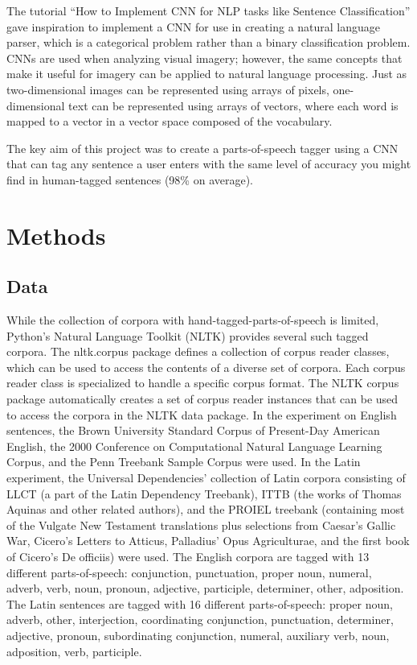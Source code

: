\documentclass[conference]{IEEEtran}
\begin{document}
    The tutorial  “How to Implement CNN for NLP tasks like Sentence Classification” gave inspiration to implement a CNN for use in creating a natural language parser, which is a categorical problem rather than a binary classification problem\cite{b3}. CNNs are used when analyzing visual imagery; however, the same concepts that make it useful for imagery can be applied to natural language processing. Just as two-dimensional images can be represented using arrays of pixels, one-dimensional text can be represented using arrays of vectors, where each word is mapped to a vector in a vector space composed of the vocabulary\cite{b2}. 
    
    The key aim of this project was to create a parts-of-speech tagger using a CNN that can tag any sentence a user enters with the same level of accuracy you might find in human-tagged sentences (98\% on average).

\section{Methods}
\subsection{Data}
    While the collection of corpora with hand-tagged-parts-of-speech is limited, Python’s Natural Language Toolkit (NLTK) provides several such tagged corpora. The nltk.corpus package defines a collection of corpus reader classes, which can be used to access the contents of a diverse set of corpora. Each corpus reader class is specialized to handle a specific corpus format. The NLTK corpus package automatically creates a set of corpus reader instances that can be used to access the corpora in the NLTK data package\cite{b13}. In the experiment on English sentences, the Brown University Standard Corpus of Present-Day American English, the 2000 Conference on Computational Natural Language Learning Corpus, and the Penn Treebank Sample Corpus were used\cite{b18}. In the Latin experiment, the Universal Dependencies’ collection of Latin corpora consisting of LLCT (a part of the Latin Dependency Treebank), ITTB (the works of Thomas Aquinas and other related authors), and the PROIEL treebank (containing most of the Vulgate New Testament translations plus selections from Caesar's Gallic War, Cicero's Letters to Atticus, Palladius' Opus Agriculturae, and the first book of Cicero's De officiis) were used\cite{b19}. The English corpora are tagged with 13 different parts-of-speech: conjunction, punctuation, proper noun, numeral, adverb, verb, noun, pronoun, adjective, participle, determiner, other, adposition. The Latin sentences are tagged with 16 different parts-of-speech: proper noun, adverb, other, interjection, coordinating conjunction, punctuation, determiner, adjective, pronoun, subordinating conjunction, numeral, auxiliary verb, noun, adposition, verb, participle.
\end{document}
